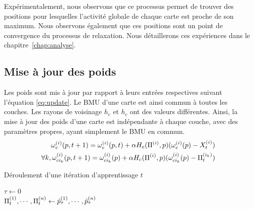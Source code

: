 \documentclass[../main]{subfiles}
\begin{document}
Expérimentalement, nous observons que ce processus permet de trouver des positions pour lesquelles l'activité globale de chaque carte est proche de son maximum.
Nous observons également que ces positions sont un point de convergence du processus de relaxation. 
Nous détaillerons ces expériences dans le chapitre~\ref{chap:analyse}.

\subsection{Mise à jour des poids}
Les poids sont mis à jour par rapport à leurs entrées respectives suivant l'équation \ref{eq:update}. Le BMU d'une carte est ainsi commun à toutes les couches. 
Les rayons de voisinage $h_e$ et $h_c$ ont des valeurs différentes.
Ainsi, la mise à jour des poids d'une carte est indépendante à chaque couche, avec des paramètres propres, ayant simplement le BMU en commun.
\begin{align}
 \omega_{e}^{({i})}(p,t+1) = \omega_{e}^{({i})}(p,t) + \alpha H_{e}(\Pi^{({i})}, p)(\omega_{e}^{({i})}(p) - X_t^{({i})}) \\
\forall k, \omega_{ci_k}^{({i})}(p,t+1) = \omega_{ci_k}^{({i})}(p) + \alpha H_{c}(\Pi^{({i})},p)(\omega_{ci_k}^{({i})}(p) - \Pi^{({i_k})}_t)
\end{align}


\begin{algorithm}\label{algo:cxsom}
\caption{Déroulement d'une itération d'apprentissage $t$}
\SetAlgoLined
  $\tau \leftarrow 0$\\
  $\Pi^{({1})}_t, \cdots, \Pi^{({n})}_t \leftarrow \hat{p}^{({1})}_\tau, \cdots , \hat{p}^{({n})}_\tau$\\
 \end{algorithm}
 
\end{document}
